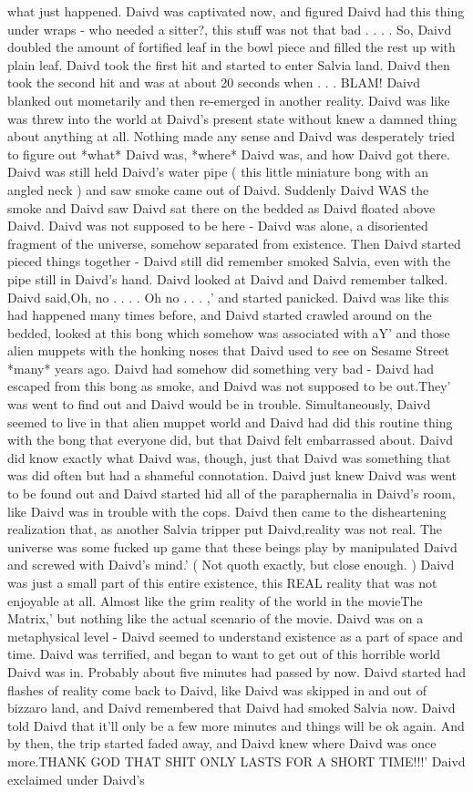 \documentclass[12pt]{book}
\begin{document}
what just happened. Daivd was captivated now, and figured Daivd had this thing under wraps - who needed a sitter?, this stuff was not that bad . . .  . So, Daivd doubled the amount of fortified leaf in the bowl piece and filled the rest up with plain leaf. Daivd took the first hit and started to enter Salvia land. Daivd then took the second hit and was at about 20 seconds when . . .  BLAM! Daivd blanked out mometarily and then re-emerged in another reality. Daivd was like was threw into the world at Daivd's present state without knew a damned thing about anything at all. Nothing made any sense and Daivd was desperately tried to figure out *what* Daivd was, *where* Daivd was, and how Daivd got there. Daivd was still held Daivd's water pipe ( this little miniature bong with an angled neck ) and saw smoke came out of Daivd. Suddenly Daivd WAS the smoke and Daivd saw Daivd sat there on the bedded as Daivd floated above Daivd. Daivd was not supposed to be here - Daivd was alone, a disoriented fragment of the universe, somehow separated from existence. Then Daivd started pieced things together - Daivd still did remember smoked Salvia, even with the pipe still in Daivd's hand. Daivd looked at Daivd and Daivd remember talked. Daivd said,Oh, no . . .  . Oh no . . .  ,' and started panicked. Daivd was like this had happened many times before, and Daivd started crawled around on the bedded, looked at this bong which somehow was associated with aY' and those alien muppets with the honking noses that Daivd used to see on Sesame Street *many* years ago. Daivd had somehow did something very bad - Daivd had escaped from this bong as smoke, and Daivd was not supposed to be out.They' was went to find out and Daivd would be in trouble. Simultaneously, Daivd seemed to live in that alien muppet world and Daivd had did this routine thing with the bong that everyone did, but that Daivd felt embarrassed about. Daivd did know exactly what Daivd was, though, just that Daivd was something that was did often but had a shameful connotation. Daivd just knew Daivd was went to be found out and Daivd started hid all of the paraphernalia in Daivd's room, like Daivd was in trouble with the cops. Daivd then came to the disheartening realization that, as another Salvia tripper put Daivd,reality was not real. The universe was some fucked up game that these beings play by manipulated Daivd and screwed with Daivd's mind.' ( Not quoth exactly, but close enough. ) Daivd was just a small part of this entire existence, this REAL reality that was not enjoyable at all. Almost like the grim reality of the world in the movieThe Matrix,' but nothing like the actual scenario of the movie. Daivd was on a metaphysical level - Daivd seemed to understand existence as a part of space and time. Daivd was terrified, and began to want to get out of this horrible world Daivd was in. Probably about five minutes had passed by now. Daivd started had flashes of reality come back to Daivd, like Daivd was skipped in and out of bizzaro land, and Daivd remembered that Daivd had smoked Salvia now. Daivd told Daivd that it'll only be a few more minutes and things will be ok again. And by then, the trip started faded away, and Daivd knew where Daivd was once more.THANK GOD THAT SHIT ONLY LASTS FOR A SHORT TIME!!!' Daivd exclaimed under Daivd's 
\end{document}
